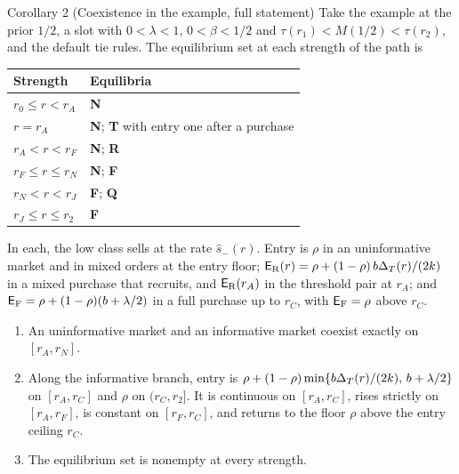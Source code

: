 \begin{named}{Corollary 2 (Coexistence in the example, full statement)}
Take the example at the prior \(1/2\), a slot with \(0<\lambda<1\), \(0<\beta<1/2\) and \(\tau(r_1)<M(1/2)<\tau(r_2)\),
and the default tie rules. The equilibrium set at each strength of the path is
\begin{center}
\begin{tabular}{@{}ll@{}}
\toprule
Strength & Equilibria\\
\midrule
\(r_0\le r<r_A\) & \textup{\textbf{N}}\\
\(r=r_A\) & \textup{\textbf{N}}; \textup{\textbf{T}} with entry one after a purchase\\
\(r_A<r<r_F\) & \textup{\textbf{N}}; \textup{\textbf{R}}\\
\(r_F\le r\le r_N\) & \textup{\textbf{N}}; \textup{\textbf{F}}\\
\(r_N<r<r_J\) & \textup{\textbf{F}}; \textup{\textbf{Q}}\\
\(r_J\le r\le r_2\) & \textup{\textbf{F}}\\
\bottomrule
\end{tabular}
\end{center}
In each, the low class sells at the rate \(\hat s_-(r)\). Entry is \(\rho\) in an uninformative market and in mixed orders at the
entry floor; \(\mathsf{E}_{\rm R}(r)=\rho+(1-\rho)\,b\Delta_T(r)/(2k)\) in a mixed purchase that recruits, and \(\mathsf{E}_{\rm R}(r_A)\)
in the threshold pair at \(r_A\); and \(\mathsf{E}_{\rm F}=\rho+(1-\rho)(b+\lambda/2)\) in a full purchase up to \(r_C\), with
\(\mathsf{E}_{\rm F}=\rho\) above \(r_C\).
\begin{enumerate}[label=(\alph*),leftmargin=2em]
\item An uninformative market and an informative market coexist exactly on \([r_A,r_N]\).
\item Along the informative branch, entry is \(\rho+(1-\rho)\min\{b\Delta_T(r)/(2k),\,b+\lambda/2\}\) on \([r_A,r_C]\) and
\(\rho\) on \((r_C,r_2]\). It is continuous on \([r_A,r_C]\), rises strictly on \([r_A,r_F]\), is constant on
\([r_F,r_C]\), and returns to the floor \(\rho\) above the entry ceiling \(r_C\).
\item The equilibrium set is nonempty at every strength.
\end{enumerate}
\end{named}

